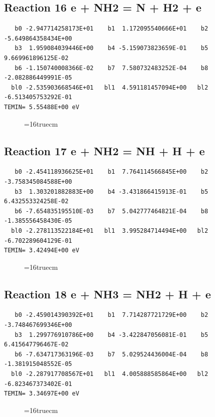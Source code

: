 \documentclass[12pt,dvipdfm]{article}
\begin{document}
\subsection{
Reaction 16 e + NH2 = N + H2 + e}
\begin{small}\begin{verbatim}
   b0 -2.947714258173E+01    b1  1.172095540666E+01    b2 -5.649864358434E+00
   b3  1.959084039446E+00    b4 -5.159073823659E-01    b5  9.669961896125E-02
   b6 -1.150740008366E-02    b7  7.580732483252E-04    b8 -2.082886449991E-05
  bl0 -2.535903668546E+01   bl1  4.591181457094E+00   bl2 -6.513405753292E-01
TEMIN= 5.55488E+00 eV
   \end{verbatim}\end{small}
\begin{figure}[h!]
\label{n2rates}
\epsfxsize=16truecm
\end{figure}
\newpage

\subsection{
Reaction 17 e + NH2 = NH + H + e}
\begin{small}\begin{verbatim}
   b0 -2.454118936625E+01    b1  7.764114566845E+00    b2 -3.758345084588E+00
   b3  1.303201882883E+00    b4 -3.431866415913E-01    b5  6.432553324258E-02
   b6 -7.654835195510E-03    b7  5.042777464821E-04    b8 -1.385556458430E-05
  bl0 -2.278113522184E+01   bl1  3.995284714494E+00   bl2 -6.702289604129E-01
TEMIN= 3.42494E+00 eV
   \end{verbatim}\end{small}
\begin{figure}[h!]
\label{n2rates}
\epsfxsize=16truecm
\end{figure}
\newpage

\subsection{
Reaction 18 e + NH3 = NH2 + H + e}
\begin{small}\begin{verbatim}
   b0 -2.459014390392E+01    b1  7.714287721729E+00    b2 -3.748467699346E+00
   b3  1.299776910786E+00    b4 -3.422847056081E-01    b5  6.415647796467E-02
   b6 -7.634717363196E-03    b7  5.029524436004E-04    b8 -1.381915048552E-05
  bl0 -2.287917708567E+01   bl1  4.005888585864E+00   bl2 -6.823467373402E-01
TEMIN= 3.34697E+00 eV
   \end{verbatim}\end{small}
\begin{figure}[h!]
\label{n2rates}
\epsfxsize=16truecm
\end{figure}
\newpage
\end{document}
